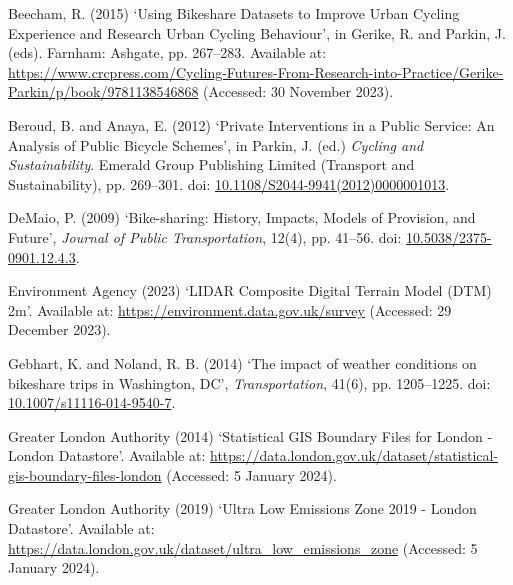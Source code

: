 \documentclass[
  12pt,
  a4paper,
  DIV=11,
  numbers=noendperiod]{scrartcl}
\newlength{\cslhangindent}
\newlength{\cslentryspacingunit} %
\newenvironment{CSLReferences}[2] %
 {%
  \setlength{\parindent}{0pt}
  \ifodd #1
  \let\oldpar\par
  \def\par{\hangindent=\cslhangindent\oldpar}
  \fi
  \setlength{\parskip}{#2\cslentryspacingunit}
 }%
 {}
\begin{document}
\hypertarget{refs}{}
\begin{CSLReferences}{0}{0}
\leavevmode{}%
Beecham, R. (2015) {`Using {Bikeshare} {Datasets} to {Improve} {Urban}
{Cycling} {Experience} and {Research} {Urban} {Cycling} {Behaviour}'},
in Gerike, R. and Parkin, J. (eds). Farnham: Ashgate, pp. 267--283.
Available at:
\url{https://www.crcpress.com/Cycling-Futures-From-Research-into-Practice/Gerike-Parkin/p/book/9781138546868}
(Accessed: 30 November 2023).

\leavevmode{}%
Beroud, B. and Anaya, E. (2012) {`Private {Interventions} in a {Public}
{Service}: {An} {Analysis} of {Public} {Bicycle} {Schemes}'}, in Parkin,
J. (ed.) \emph{Cycling and {Sustainability}}. Emerald Group Publishing
Limited (Transport and {Sustainability}), pp. 269--301. doi:
\href{https://doi.org/10.1108/S2044-9941(2012)0000001013}{10.1108/S2044-9941(2012)0000001013}.

\leavevmode{}%
DeMaio, P. (2009) {`Bike-sharing: {History}, {Impacts}, {Models} of
{Provision}, and {Future}'}, \emph{Journal of Public Transportation},
12(4), pp. 41--56. doi:
\href{https://doi.org/10.5038/2375-0901.12.4.3}{10.5038/2375-0901.12.4.3}.

\leavevmode{}%
Environment Agency (2023) {`{LIDAR} {Composite} {Digital} {Terrain}
{Model} ({DTM}) 2m'}. Available at:
\url{https://environment.data.gov.uk/survey} (Accessed: 29 December
2023).

\leavevmode{}%
Gebhart, K. and Noland, R. B. (2014) {`The impact of weather conditions
on bikeshare trips in {Washington}, {DC}'}, \emph{Transportation},
41(6), pp. 1205--1225. doi:
\href{https://doi.org/10.1007/s11116-014-9540-7}{10.1007/s11116-014-9540-7}.

\leavevmode{}%
Greater London Authority (2014) {`Statistical {GIS} {Boundary} {Files}
for {London} - {London} {Datastore}'}. Available at:
\url{https://data.london.gov.uk/dataset/statistical-gis-boundary-files-london}
(Accessed: 5 January 2024).

\leavevmode{}%
Greater London Authority (2019) {`Ultra {Low} {Emissions} {Zone} 2019 -
{London} {Datastore}'}. Available at:
\url{https://data.london.gov.uk/dataset/ultra_low_emissions_zone}
(Accessed: 5 January 2024).


\end{CSLReferences}
\end{document}
